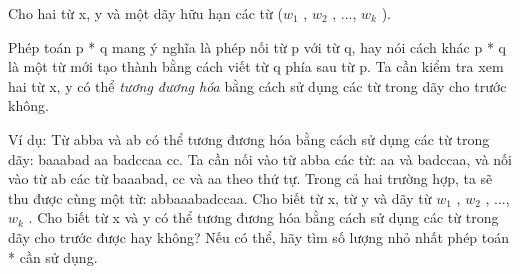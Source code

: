 Cho hai từ x, y và một dãy hữu hạn các từ ($w_{1}$   , $w_{2}$   , ..., $w_{k}$   ).  



   Phép toán p * q mang ý nghĩa là phép nối từ p với từ q, hay nói cách khác p * q là một từ mới tạo thành bằng cách viết từ q phía sau từ p.   Ta cần kiểm tra xem hai từ x, y có thể   \textit{    tương đương hóa   }   bằng cách sử dụng các từ trong dãy cho trước không.  

   Ví dụ: Từ abba và ab có thể tương đương hóa bằng cách sử dụng các từ trong dãy: baaabad aa badccaa cc. Ta cần nối vào từ abba các   từ: aa và badccaa, và nối vào từ ab các từ baaabad, cc và aa theo thứ tự. Trong cả hai trường hợp, ta sẽ thu được cùng một từ:   abbaaabadccaa.
Cho biết từ x, từ y và dãy từ $w_{1}$   , $w_{2}$   , ..., $w_{k}$   . Cho biết từ x và y có thể tương đương hóa bằng cách   sử dụng các từ trong dãy cho trước được hay không? Nếu có thể, hãy tìm số lượng nhỏ nhất phép toán * cần sử dụng.